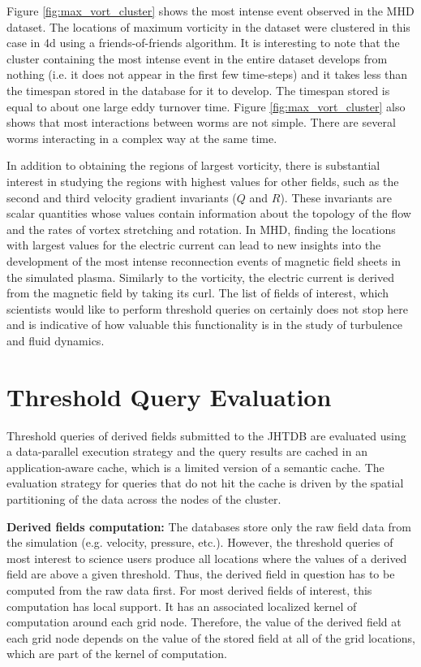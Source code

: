 \documentclass{sig-alternate}
\begin{document}
Figure \ref{fig:max_vort_cluster} shows the most intense event observed in the MHD dataset. The locations of maximum vorticity in the dataset were clustered
in this case in 4d using a friends-of-friends algorithm. It is interesting to note that the cluster containing the most intense event in the entire dataset develops
from nothing (i.e. it does not appear in the first few time-steps) and it takes less than the timespan stored in the database for it to develop. 
The timespan stored is equal to about one large eddy turnover time. 
Figure \ref{fig:max_vort_cluster} also shows that most interactions between worms are not simple. 
There are several worms interacting in a complex way at the same time.

In addition to obtaining the regions of largest vorticity, there is substantial interest in studying the regions with highest values for other fields, such as
the second and third velocity gradient invariants ($Q$ and $R$). These invariants are scalar quantities whose values contain information about the 
topology of the flow and the rates of vortex stretching and rotation. In MHD, finding the locations with largest values for the electric current
can lead to new insights into the development of the most intense reconnection events of magnetic field sheets in the simulated plasma. Similarly to
the vorticity, the electric current is derived from the magnetic field by taking its curl. The list of fields of interest, which scientists would like to perform 
threshold queries on certainly does not stop here and is indicative of how valuable this functionality is in the study of turbulence and fluid dynamics.

\section{Threshold Query Evaluation}

Threshold queries of derived fields submitted to the JHTDB are evaluated using a data-parallel execution strategy and the query results are 
cached in an application-aware cache, which is a limited version of a semantic cache. 
The evaluation strategy for queries that do not hit the cache is driven by the spatial partitioning of the data across the nodes of the cluster.

{\bf Derived fields computation:} The databases store only the raw field data from the simulation (e.g. velocity, pressure, etc.). However, the threshold
queries of most interest to science users produce all locations where the values of a derived field are above a given threshold. Thus, the
derived field in question has to be computed from the raw data first. For most derived fields of interest, this computation has local support. It has an 
associated localized kernel of computation around each grid node. Therefore, the value of the derived field at each grid node depends on the value of the
stored field at all of the grid locations, which are part of the kernel of computation. 
\end{document}
